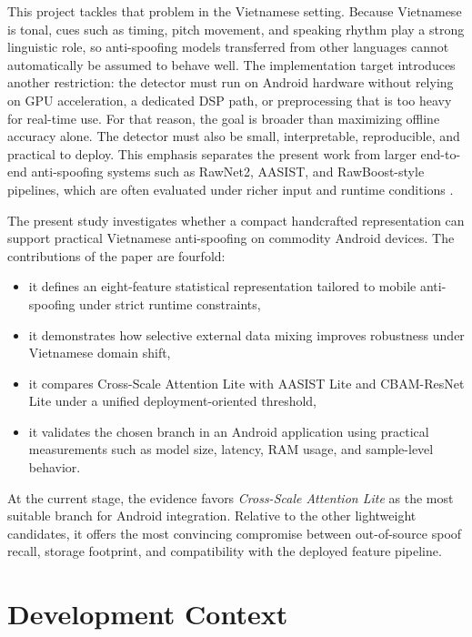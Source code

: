 \documentclass[pdflatex,sn-mathphys-num]{sn-jnl}
\begin{document}
This project tackles that problem in the Vietnamese setting. Because Vietnamese is tonal, cues such as timing, pitch movement, and speaking rhythm play a strong linguistic role, so anti-spoofing models transferred from other languages cannot automatically be assumed to behave well. The implementation target introduces another restriction: the detector must run on Android hardware without relying on GPU acceleration, a dedicated DSP path, or preprocessing that is too heavy for real-time use. For that reason, the goal is broader than maximizing offline accuracy alone. The detector must also be small, interpretable, reproducible, and practical to deploy. This emphasis separates the present work from larger end-to-end anti-spoofing systems such as RawNet2, AASIST, and RawBoost-style pipelines, which are often evaluated under richer input and runtime conditions \cite{tak2021rawnet2,jung2022aasist,tak2022rawboost}.

The present study investigates whether a compact handcrafted representation can support practical Vietnamese anti-spoofing on commodity Android devices. The contributions of the paper are fourfold:

\begin{itemize}[leftmargin=*]
\item it defines an eight-feature statistical representation tailored to mobile anti-spoofing under strict runtime constraints,
\item it demonstrates how selective external data mixing improves robustness under Vietnamese domain shift,
\item it compares Cross-Scale Attention Lite with AASIST Lite and CBAM-ResNet Lite under a unified deployment-oriented threshold,
\item it validates the chosen branch in an Android application using practical measurements such as model size, latency, RAM usage, and sample-level behavior.
\end{itemize}

At the current stage, the evidence favors \textit{Cross-Scale Attention Lite} as the most suitable branch for Android integration. Relative to the other lightweight candidates, it offers the most convincing compromise between out-of-source spoof recall, storage footprint, and compatibility with the deployed feature pipeline.

\section{Development Context}\label{sec:completed-work}
\end{document}
